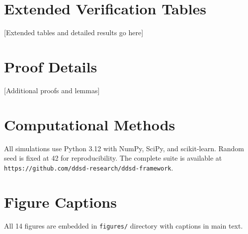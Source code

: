 \documentclass[11pt,a4paper]{article}
\theoremstyle{plain}
\theoremstyle{definition}
\theoremstyle{remark}
\begin{document}
\newpage
\appendix

\section{Extended Verification Tables}
\label{app:tables}

[Extended tables and detailed results go here]

\section{Proof Details}
\label{app:proofs}

[Additional proofs and lemmas]

\section{Computational Methods}
\label{app:methods}

All simulations use Python 3.12 with NumPy, SciPy, and scikit-learn. Random seed is fixed at 42 for reproducibility. The complete suite is available at \texttt{https://github.com/ddsd-research/ddsd-framework}.

\section{Figure Captions}
\label{app:figures}

All 14 figures are embedded in \texttt{figures/} directory with captions in main text.
\end{document}
